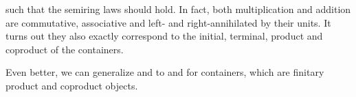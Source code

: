 \begin{code}
\AgdaSpace{}%
\AgdaSymbol{)}\AgdaSpace{}%
\AgdaSpace{}%
\AgdaSymbol{(}\AgdaSpace{}%
\AgdaSpace{}%
\AgdaSymbol{)}\AgdaSpace{}%
\AgdaSymbol{=}\AgdaSpace{}%
\AgdaSymbol{(}\AgdaSpace{}%
\AgdaSpace{}%
\AgdaSymbol{)}\AgdaSpace{}%
\AgdaSpace{}%
\AgdaSpace{}%
\AgdaSymbol{(}\AgdaSpace{}%
\AgdaSymbol{)}\AgdaSpace{}%
\AgdaSpace{}%
\AgdaSpace{}%
\AgdaSpace{}%
\AgdaSymbol{;}\AgdaSpace{}%
\AgdaSymbol{(}\AgdaSpace{}%
\AgdaSymbol{)}\AgdaSpace{}%
\AgdaSpace{}%
\AgdaSpace{}%
\AgdaSpace{}%
\AgdaSymbol{\}}\<%
\end{code}

such that the semiring laws should hold. In fact, both multiplication and addition are commutative, associative and left- and right-annihilated by their units. It turns out they also exactly correspond to the initial, terminal, product and coproduct of the containers. 

Even better, we can generalize  and  to  and  for containers, which are finitary product and coproduct objects.

\begin{code}[hide]%
\>[0]\AgdaSpace{}%
\AgdaModule{\AgdaUnderscore{}}\AgdaSpace{}%
\<%
\\
\>[0][@{}l@{\AgdaIndent{0}}]%
\>[2]\AgdaSpace{}%
\<%
\end{code}

